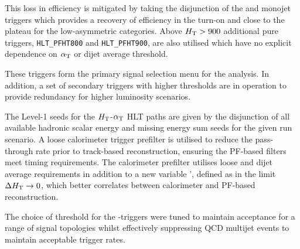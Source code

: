 This loss in efficiency is mitigated by taking the 
disjunction of the \alt and monojet triggers which provides a recovery 
of efficiency in the turn-on and close to the plateau for the low-\scalht asymmetric categories. 
Above $\mbox{$H_\text{T}$} > 900$ \GeV additional pure \scalht triggers, \verb!HLT_PFHT800! and \verb!HLT_PFHT900!, 
are also utilised which have no explicit dependence on $\alpha_{\text{T}}$ or dijet average threshold. 

These triggers form the primary signal selection menu for the analysis. In
addition, a set of secondary triggers with higher thresholds are in operation 
to provide redundancy for higher luminosity scenarios. 

The Level-1 seeds for the $\mbox{$H_\text{T}$}$-$\alpha_{\text{T}}$ HLT paths are given by the
disjunction of all available hadronic scalar energy and missing energy sum seeds for 
the given run scenario. A loose calorimeter trigger prefilter is utilised to reduce the pass-through 
rate prior to track-based reconstruction, ensuring the PF-based filters meet timing requirements. The calorimeter prefilter 
utilises loose \scalht and dijet average \pt requirements in addition to a new variable \alphat', 
defined as \alphat in the limit $\Delta\mbox{$H_\text{T}$} \rightarrow 0$, which better correlates \alphat 
between calorimeter and PF-based reconstruction. 

The choice of threshold for 
the \scalht-\alphat triggers were tuned to maintain acceptance for a range of signal topologies whilst effectively suppressing QCD 
multijet events to maintain acceptable trigger rates. 


